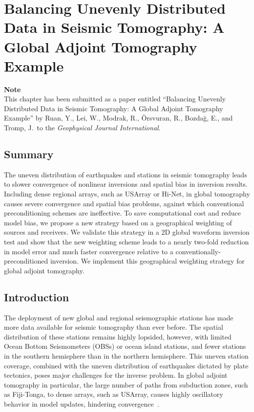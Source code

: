 \chapter{Balancing Unevenly Distributed Data in Seismic Tomography: {A} Global Adjoint Tomography Example\label{ch:weighting}}

\textbf{Note}\\
This chapter has been submitted as a paper entitled ``Balancing Unevenly Distributed Data in Seismic Tomography: {A} Global Adjoint Tomography Example'' by Ruan, Y., Lei, W., Modrak, R., \"{O}rsvuran, R., Bozda\u{g}, E., and Tromp, J.\ to the \textit{Geophysical Journal International}.


\section*{Summary}
The uneven distribution of earthquakes and stations in seismic tomography leads to slower convergence of nonlinear inversions and spatial bias in inversion results.
Including dense regional arrays, such as USArray or Hi-Net, in global tomography causes severe convergence and spatial bias problems, against which conventional preconditioning  schemes are ineffective.
To save computational cost and reduce model bias, we propose a new strategy based on a geographical weighting of sources and receivers.
We validate this strategy in
a 2D global waveform inversion test and show that the new weighting scheme leads to a nearly two-fold reduction in model error and much faster convergence relative to a conventionally-preconditioned inversion.
We implement this geographical weighting strategy for global adjoint tomography.

%
%
\section{Introduction}

The deployment of new global and regional seismographic stations has made  more data available for seismic tomography than ever before.
The spatial distribution of these stations remains highly lopsided, however, with limited Ocean Bottom Seismometers (OBSs) or ocean island stations,
and fewer stations in the southern hemisphere than in the northern hemisphere. 
This uneven station coverage, combined with the uneven distribution of earthquakes dictated by plate tectonics, poses major challenges for the inverse problem.   In global adjoint tomography in particular, the large number of paths from subduction zones, such as Fiji-Tonga, to dense arrays,  such as USArray,  causes highly oscillatory behavior in model updates, hindering convergence~\cite{bozdaug2016global}. 

